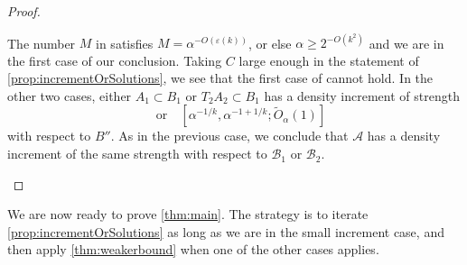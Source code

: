 \documentclass{daj}
\theoremstyle{definition}
\newcommand{\eps}{\varepsilon}
\newcommand{\A}{\ensuremath{\mathcal{A}}}
\newcommand{\B}{\ensuremath{\mathcal{B}}}
\begin{document}
\begin{proof}[Proof]
\begin{enumerate}
	The number $M$ in \cite[Proposition~11.8]{BS} satisfies $M = \alpha^{-O(\eps(k))}$, or else $\alpha \geq 2^{-O(k^2)}$ and we are in the first case of our conclusion. Taking $C$ large enough in the statement of \cref{prop:incrementOrSolutions}, we see that the first case of \cite[Proposition~11.8]{BS} cannot hold. In the other two cases, either $A_1\subset B_1$ or $T_2A_2\subset B_1$ has a density increment of strength 
	\begin{equation*}
	[\alpha^{O(\eps(k))}, \alpha^{-O(\eps(k))}; \tilde{O}_{\alpha}(1)]\quad \text{or}\quad[\alpha^{-1/k}, \alpha^{-1+1/k}; \tilde{O}_{\alpha}(1)]
	\end{equation*}
	with respect to $B''$. As in the previous case, we conclude that $\A$ has a density increment of the same strength with respect to $\B_1$ or $\B_2$.\qedhere
\end{enumerate}
\end{proof}


We are now ready to prove \cref{thm:main}. The strategy is to iterate \cref{prop:incrementOrSolutions} as long as we are in the small increment case, and then apply \cref{thm:weakerbound} when one of the other cases applies. 
\end{document}
